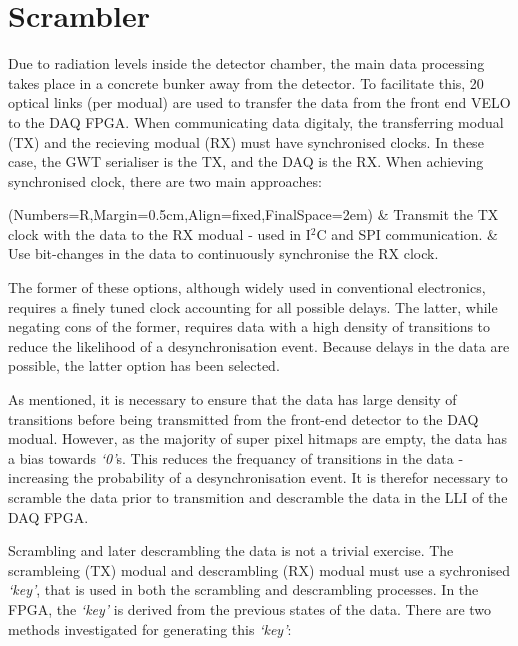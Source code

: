 \section{Scrambler}
\label{sec:scrambling_algorithms}

	Due to radiation levels inside the detector chamber, the main data processing takes place in a concrete bunker away from the detector.
	To facilitate this, 20 optical links (per modual) are used to transfer the data from the front end VELO to the DAQ FPGA.
	When communicating data digitaly, the transferring modual (TX) and the recieving modual (RX) must have synchronised clocks.
	In these case, the GWT serialiser is the TX, and the DAQ is the RX.
	When achieving synchronised clock, there are two main approaches:

	\begin{easylist}
		\ListProperties(Numbers=R,Margin=0.5cm,Align=fixed,FinalSpace=2em)
		& Transmit the TX clock with the data to the RX modual - used in I$^2$C and SPI communication.
		& Use bit-changes in the data to continuously synchronise the RX clock.
	\end{easylist}

	The former of these options, although widely used in conventional electronics, requires a finely tuned clock accounting for all possible delays.
	The latter, while negating cons of the former, requires data with a high density of transitions to reduce the likelihood of a desynchronisation event.
	Because delays in the data are possible, the latter option has been selected.

	As mentioned, it is necessary to ensure that the data has large density of transitions before being transmitted from the front-end detector to the DAQ modual.
	However, as the majority of super pixel hitmaps are empty, the data has a bias towards \textit{`0'}s.
	This reduces the frequancy of transitions in the data - increasing the probability of a desynchronisation event.
	It is therefor necessary to scramble the data prior to transmition and descramble the data in the LLI of the DAQ FPGA.
	\par
	Scrambling and later descrambling the data is not a trivial exercise.
	The scrambleing (TX) modual and descrambling (RX) modual must use a sychronised \textit{`key'}, that is used in both the scrambling and descrambling processes.
	In the FPGA, the \textit{`key'} is derived from the previous states of the data.
	There are two methods investigated for generating this \textit{`key'}:

